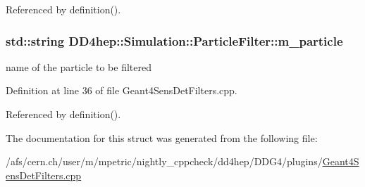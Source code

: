 Referenced by definition().\hypertarget{struct_d_d4hep_1_1_simulation_1_1_particle_filter_a410c1fd6ed11ffb97571fdeac010d882}{
\subsubsection[{m\_\-particle}]{\setlength{\rightskip}{0pt plus 5cm}std::string {\bf DD4hep::Simulation::ParticleFilter::m\_\-particle}}}
\label{struct_d_d4hep_1_1_simulation_1_1_particle_filter_a410c1fd6ed11ffb97571fdeac010d882}


name of the particle to be filtered 

Definition at line 36 of file Geant4SensDetFilters.cpp.

Referenced by definition().

The documentation for this struct was generated from the following file:\begin{DoxyCompactItemize}
\item 
/afs/cern.ch/user/m/mpetric/nightly\_\-cppcheck/dd4hep/DDG4/plugins/\hyperlink{_geant4_sens_det_filters_8cpp}{Geant4SensDetFilters.cpp}\end{DoxyCompactItemize}

